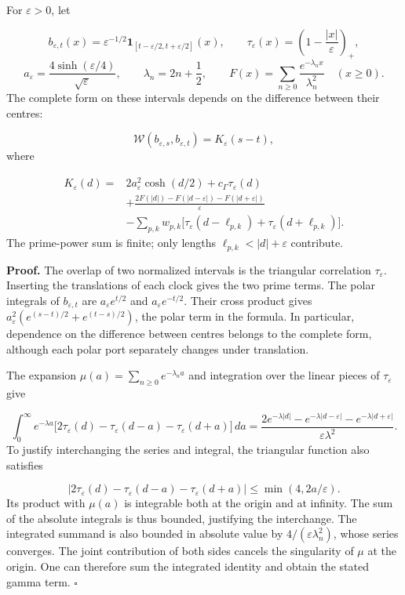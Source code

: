 For \(\varepsilon>0\), let

\[
b_{\varepsilon,t}(x)=\varepsilon^{-1/2}
\mathbf1_{[t-\varepsilon/2,t+\varepsilon/2]}(x),\qquad
\tau_\varepsilon(x)=\left(1-\frac{|x|}{\varepsilon}\right)_+,
\]
\[
a_\varepsilon=\frac{4\sinh(\varepsilon/4)}{\sqrt\varepsilon},
\qquad \lambda_n=2n+\frac12,\qquad
F(x)=\sum_{n\geq0}\frac{e^{-\lambda_nx}}{\lambda_n^2}
\quad(x\geq0).
\]
The complete form on these intervals depends on the difference between their centres:

\[
\mathscr W(b_{\varepsilon,s},b_{\varepsilon,t})
=K_\varepsilon(s-t),
\]
where

\[
\begin{aligned}
K_\varepsilon(d)={}&2a_\varepsilon^2\cosh(d/2)
+c_\Gamma\tau_\varepsilon(d)\\
&+\frac{2F(|d|)-F(|d-\varepsilon|)-F(|d+\varepsilon|)}{\varepsilon}\\
&-\sum_{p,k}w_{p,k}\bigl[
\tau_\varepsilon(d-\ell_{p,k})+
\tau_\varepsilon(d+\ell_{p,k})\bigr].
\end{aligned}
\]
The prime-power sum is finite; only lengths \(\ell_{p,k}<|d|+\varepsilon\) contribute.

\textbf{Proof.} The overlap of two normalized intervals is the triangular correlation \(\tau_\varepsilon\). Inserting the translations of each clock gives the two prime terms. The polar integrals of \(b_{\varepsilon,t}\) are \(a_\varepsilon e^{t/2}\) and \(a_\varepsilon e^{-t/2}\). Their cross product gives \(a_\varepsilon^2(e^{(s-t)/2}+e^{(t-s)/2})\), the polar term in the formula. In particular, dependence on the difference between centres belongs to the complete form, although each polar port separately changes under translation.

The expansion \(\mu(a)=\sum_{n\geq0}e^{-\lambda_na}\) and integration over the linear pieces of \(\tau_\varepsilon\) give

\[
\int_0^\infty e^{-\lambda a}
\bigl[2\tau_\varepsilon(d)-\tau_\varepsilon(d-a)
-\tau_\varepsilon(d+a)\bigr]\,da
=\frac{2e^{-\lambda|d|}-e^{-\lambda|d-\varepsilon|}
-e^{-\lambda|d+\varepsilon|}}{\varepsilon\lambda^2}.
\]
To justify interchanging the series and integral, the triangular function also satisfies

\[
|2\tau_\varepsilon(d)-\tau_\varepsilon(d-a)-\tau_\varepsilon(d+a)|
\leq\min(4,2a/\varepsilon).
\]
Its product with \(\mu(a)\) is integrable both at the origin and at infinity. The sum of the absolute integrals is thus bounded, justifying the interchange. The integrated summand is also bounded in absolute value by \(4/(\varepsilon\lambda_n^2)\), whose series converges. The joint contribution of both sides cancels the singularity of \(\mu\) at the origin. One can therefore sum the integrated identity and obtain the stated gamma term. \hfill\(\square\)


